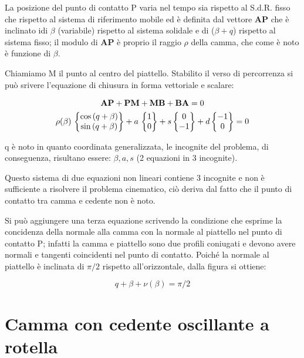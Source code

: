 		La posizione del punto di contatto P varia nel tempo sia rispetto al S.d.R. fisso che rispetto al sistema di riferimento mobile ed è definita dal vettore $\mathbf{AP}$ che è inclinato idi $\beta$ (variabile) rispetto al sistema solidale e di ($\beta + q$) rispetto al sistema fisso; il modulo di $\mathbf{AP}$ è proprio il raggio $\rho$ della camma, che come è noto è funzione di $\beta$.
		
		Chiamiamo M il punto al centro del piattello. Stabilito il verso di percorrenza si può srivere l'equazione di chiusura in forma vettoriale e scalare:
		
		\begin{gather*}
		\mathbf{AP} + \mathbf{PM} + \mathbf{MB} + \mathbf{BA} = 0\\
		\rho(\beta)\,\begin{Bmatrix}\cos{(q+\beta)}\\\sin{(q+\beta)}\end{Bmatrix} + a\,\begin{Bmatrix}1\\0\end{Bmatrix} + s\begin{Bmatrix}0\\-1\end{Bmatrix} + d\begin{Bmatrix}-1\\0\end{Bmatrix} = 0
		\end{gather*}
		
		q è noto in quanto coordinata generalizzata, le incognite del problema, di conseguenza, risultano essere: $\beta, a ,s$ (2 equazioni in 3 incognite).
		
		Questo sistema di due equazioni non lineari contiene 3 incognite e non è sufficiente a risolvere il problema cinematico, ciò deriva dal fatto che il punto di contatto tra camma e cedente non è noto.
		
		Si può aggiungere una terza equazione scrivendo la condizione che esprime la concidenza della normale alla camma con la normale al piattello nel punto di contatto P; infatti la camma e piattello sono due profili coniugati e devono avere normali e tangenti coincidenti nel punto di contatto. Poiché la normale al piattello è inclinata di $\pi/2$ rispetto all'orizzontale, dalla figura si ottiene:
		
		\[q+\beta +\nu(\beta) = \pi/2\]
		
		\section{Camma con cedente oscillante a rotella}
		
